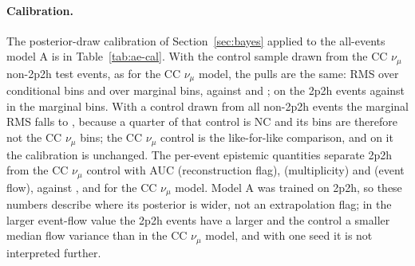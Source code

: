 \documentclass[11pt]{article}
\begin{document}
\begin{table}[h]\centering\small

\caption{2p2h holdout for the CC $\nu_\mu$ pair (Section~\ref{sec:holdout}) and the all-events pair: log losses
and closure on the held-out 2p2h test events, B on its non-2p2h CC $\nu_\mu$ control, and the bootstrap
evaluation of open dataset against B and against A (68\% intervals).}
\label{tab:ae-holdout}
\end{table}

\paragraph{Calibration.} The posterior-draw calibration of Section~\ref{sec:bayes} applied to the all-events
model A is in Table~\ref{tab:ae-cal}. With the control sample drawn from the CC $\nu_\mu$ non-2p2h test events, as
for the CC $\nu_\mu$ model, the pulls are the same: RMS \nAECalAllCondRMS{} over \nAECalAllCondBins{} conditional
bins and \nAECalAllMargRMS{} over \nAECalAllMargBins{} marginal bins, against \nAECalCCCondRMS{} and
\nAECalCCMargRMS{}; on the 2p2h events \nAECalAllTwoPMargRMS{} against \nAECalCCTwoPMargRMS{} in the marginal
bins. With a control drawn from all non-2p2h events the marginal RMS falls to \nAECalMixedMargRMS{}, because a
quarter of that control is NC and its bins are therefore not the CC $\nu_\mu$ bins; the CC $\nu_\mu$ control is
the like-for-like comparison, and on it the calibration is unchanged. The per-event epistemic quantities separate 2p2h from
the CC $\nu_\mu$ control with AUC \nAEFlagAllExistAUC{} (reconstruction flag), \nAEFlagAllCardAUC{}
(multiplicity) and \nAEFlagAllFlowAUC{} (event flow), against \nAEFlagCCExistAUC{}, \nAEFlagCCCardAUC{} and
\nAEFlagCCFlowAUC{} for the CC $\nu_\mu$ model. Model A was trained on 2p2h, so these numbers describe where its
posterior is wider, not an extrapolation flag; in the larger event-flow value the 2p2h events have a larger and the
control a smaller median flow variance than in the CC $\nu_\mu$ model, and with one seed it is not interpreted
further.

\begin{table}[h]\centering\small
\resizebox{\textwidth}{!}{}
\caption{Posterior-draw calibration of model A: pull RMS over the bins (number of bins, fraction within
$|\mathrm{pull}|<2$) on the held-out 2p2h events and on a 300,000-event non-2p2h control, and the AUC with which
the per-event epistemic quantities separate 2p2h from the control. The CC $\nu_\mu$ control is the like-for-like
comparison; the all-events control is shown for completeness.}
\label{tab:ae-cal}
\end{table}
\end{document}
